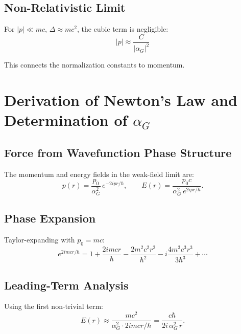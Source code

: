 \documentclass[11pt,a4paper]{article}
\theoremstyle{definition}
\theoremstyle{remark}
\begin{document}
	\subsection{Non-Relativistic Limit}
	
	For $|p|\ll mc$, $\Delta\approx mc^2$, the cubic term is negligible:
	\begin{equation}
		\boxed{|p| \approx \frac{C}{|\alpha_G|^2}}
		\label{eq:nr_momentum}
	\end{equation}
	
	This connects the normalization constants to momentum.
	
	\section{Derivation of Newton's Law and Determination of $\alpha_G$}
	\label{sec:newton}
	
	\subsection{Force from Wavefunction Phase Structure}
	
	The momentum and energy fields in the weak-field limit are:
	\begin{equation}
		p(r) = \frac{p_0}{\alpha_G^2}\,e^{-2ipr/\hbar}, \qquad
		E(r) = \frac{p_0 c}{\alpha_G^2\,e^{2ipr/\hbar}}.
	\end{equation}
	
	\subsection{Phase Expansion}
	
	Taylor-expanding with $p_0=mc$:
	\begin{equation}
		e^{2imcr/\hbar} = 1 + \frac{2imcr}{\hbar} - \frac{2m^2c^2r^2}{\hbar^2} - i\frac{4m^3c^3r^3}{3\hbar^3} + \cdots
	\end{equation}
	
	\subsection{Leading-Term Analysis}
	
	Using the first non-trivial term:
	\begin{equation}
		E(r) \approx \frac{mc^2}{\alpha_G^2\cdot 2imcr/\hbar} = \frac{c\hbar}{2i\,\alpha_G^2\,r}.
	\end{equation}
	
\end{document}
